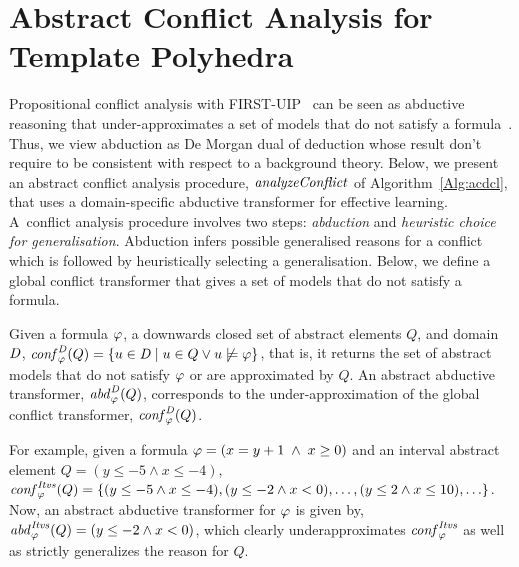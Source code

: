 \section{Abstract Conflict Analysis for Template Polyhedra}\label{sec:conflict}
%
Propositional conflict analysis with FIRST-UIP~\cite{cdcl} can be seen as
abductive reasoning that under-approximates a set of models that do not
satisfy a formula~\cite{sas12,dhk2013-popl}.  Thus, we view abduction as 
De Morgan dual of deduction whose result don't require to be consistent with respect
to a background theory.  Below, we present an abstract
conflict analysis procedure, $\mathit{analyzeConflict}$ of
Algorithm~\ref{Alg:acdcl}, that uses a domain-specific abductive transformer
for effective learning.  A~conflict analysis procedure involves two steps:
{\em abduction} and {\em heuristic choice for generalisation}.  Abduction
infers possible generalised reasons for a conflict which is followed by
heuristically selecting a generalisation.  Below, we define a global 
conflict transformer that gives a set of models that do not satisfy a 
formula.  
\begin{definition}
  Given a formula $\varphi$, a downwards closed set of abstract elements $Q$,
  and domain $\mathit{D}$, $\mathit{conf}_{\varphi}^{\mathit{D}}(Q) = \{u \in \mathit{D} \mid u \in
  Q \vee u \not\models \varphi \}$, that is, it returns 
  the set of abstract models that do not satisfy $\varphi$ or are approximated by 
  $Q$.  An abstract abductive transformer, $\mathit{abd}_{\varphi}^{\mathit{D}}(Q)$, corresponds to 
  the under-approximation of the global conflict transformer,
  $\mathit{conf}_{\varphi}^{\mathit{D}}(Q)$.  
\end{definition}
%
%
For example, given a formula $\varphi=(x=y+1\; \wedge\; x\geq 0)$ and an interval 
abstract element $Q=(y\leq-5 \wedge x \leq -4)$, 
$\conf{\formula}{\intervals}(Q) = \{(y\leq-5 \land x \leq -4),\linebreak 
(y \leq -2 \land x < 0), \ldots, (y \leq 2 \land x \leq 10), \ldots \}$.  
%
Now, an abstract abductive transformer for $\varphi$ 
is given by, $\mathit{abd}_{\varphi}^{\mathit{Itvs}}(Q)=(y \leq -2 \land x < 0)$, 
which clearly underapproximates $\mathit{conf}_{\varphi}^{\mathit{Itvs}}$ as well as 
strictly generalizes the reason for $Q$. 
%


